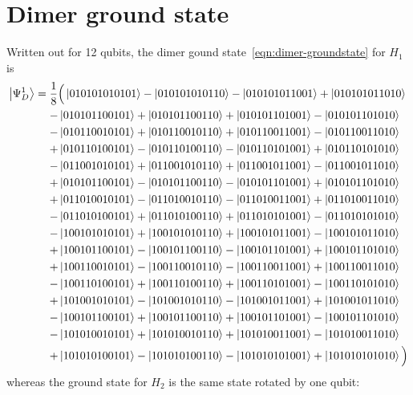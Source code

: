 \documentclass[a4paper,12pt]{article}
\newcommand{\bleq}{\ensuremath{\mathrel{\phantom{=}}}}
\newcommand{\nnl}{\nonumber\\}
\begin{document}
\appendix

\section{Dimer ground state}
Written out for 12 qubits, the dimer gound state~\eqref{eqn:dimer-groundstate} for $H_1$ is
{\footnotesize
\begin{align}
\ket{\Psi_D^1} &= \frac{1}{8} \Big(
  \ket{010101010101}
- \ket{010101010110}
- \ket{010101011001}
+ \ket{010101011010} \nnl &\bleq
- \ket{010101100101}
+ \ket{010101100110}
+ \ket{010101101001}
- \ket{010101101010} \nnl &\bleq
%
- \ket{010110010101}
+ \ket{010110010110}
+ \ket{010110011001}
- \ket{010110011010} \nnl &\bleq
+ \ket{010110100101}
- \ket{010110100110}
- \ket{010110101001}
+ \ket{010110101010} \nnl &\bleq
%
%
- \ket{011001010101}
+ \ket{011001010110}
+ \ket{011001011001}
- \ket{011001011010} \nnl &\bleq
+ \ket{010101100101}
- \ket{010101100110}
- \ket{010101101001}
+ \ket{010101101010} \nnl &\bleq
%
+ \ket{011010010101}
- \ket{011010010110}
- \ket{011010011001}
+ \ket{011010011010} \nnl &\bleq
- \ket{011010100101}
+ \ket{011010100110}
+ \ket{011010101001}
- \ket{011010101010} \nnl &\bleq
%
%
%
- \ket{100101010101}
+ \ket{100101010110}
+ \ket{100101011001}
- \ket{100101011010} \nnl &\bleq
+ \ket{100101100101}
- \ket{100101100110}
- \ket{100101101001}
+ \ket{100101101010} \nnl &\bleq
%
+ \ket{100110010101}
- \ket{100110010110}
- \ket{100110011001}
+ \ket{100110011010} \nnl &\bleq
- \ket{100110100101}
+ \ket{100110100110}
+ \ket{100110101001}
- \ket{100110101010} \nnl &\bleq
%
%
+ \ket{101001010101}
- \ket{101001010110}
- \ket{101001011001}
+ \ket{101001011010} \nnl &\bleq
- \ket{100101100101}
+ \ket{100101100110}
+ \ket{100101101001}
- \ket{100101101010} \nnl &\bleq
%
- \ket{101010010101}
+ \ket{101010010110}
+ \ket{101010011001}
- \ket{101010011010} \nnl &\bleq
+ \ket{101010100101}
- \ket{101010100110}
- \ket{101010101001}
+ \ket{101010101010}
\Big)
\end{align}}
whereas the ground state for $H_2$ is the same state rotated by one qubit:
\end{document}
